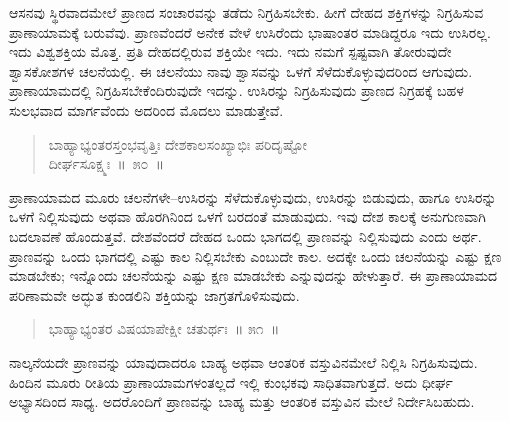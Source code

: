 \vspace{-0.3cm}


ಆಸನವು ಸ್ಥಿರವಾದಮೇಲೆ ಪ್ರಾಣದ ಸಂಚಾರವನ್ನು ತಡೆದು ನಿಗ್ರಹಿಸಬೇಕು. ಹೀಗೆ ದೇಹದ ಶಕ್ತಿಗಳನ್ನು ನಿಗ್ರಹಿಸುವ ಪ್ರಾಣಾಯಾಮಕ್ಕೆ ಬರುವೆವು. ಪ್ರಾಣವೆಂದರೆ ಅನೇಕ ವೇಳೆ ಉಸಿರೆಂದು ಭಾಷಾಂತರ ಮಾಡಿದ್ದರೂ ಇದು ಉಸಿರಲ್ಲ. ಇದು ವಿಶ್ವಶಕ್ತಿಯ ಮೊತ್ತ. ಪ್ರತಿ ದೇಹದಲ್ಲಿರುವ ಶಕ್ತಿಯೇ ಇದು. ಇದು ನಮಗೆ ಸ್ಪಷ್ಟವಾಗಿ ತೋರುವುದೇ ಶ್ವಾಸಕೋಶಗಳ ಚಲನೆಯಲ್ಲಿ. ಈ ಚಲನೆಯು ನಾವು ಶ್ವಾಸವನ್ನು ಒಳಗೆ ಸೆಳೆದುಕೊಳ್ಳುವುದರಿಂದ ಆಗುವುದು. ಪ್ರಾಣಾಯಾಮದಲ್ಲಿ ನಿಗ್ರಹಿಸಬೇಕೆಂದಿರುವುದೇ ಇದನ್ನು. ಉಸಿರನ್ನು ನಿಗ್ರಹಿಸುವುದು ಪ್ರಾಣದ ನಿಗ್ರಹಕ್ಕೆ ಬಹಳ ಸುಲಭವಾದ ಮಾರ್ಗವೆಂದು ಅದರಿಂದ ಮೊದಲು ಮಾಡುತ್ತೇವೆ. 

\vspace{-0.3cm}

\begin{verse}
ಬಾಹ್ಯಾಭ್ಯಂತರಸ್ತಂಭವೃತ್ತಿಃ ದೇಶಕಾಲಸಂಖ್ಯಾಭಿಃ ಪರಿದೃಷ್ಟೋ\\
\hspace{6cm} ದೀರ್ಘಸೂಕ್ಷ್ಮಃ~॥~೫೦~॥
\end{verse}

\vspace{-0.3cm}


ಪ್ರಾಣಾಯಾಮದ ಮೂರು ಚಲನೆಗಳೇ–ಉಸಿರನ್ನು ಸೆಳೆದುಕೊಳ್ಳುವುದು, ಉಸಿರನ್ನು ಬಿಡುವುದು, ಹಾಗೂ ಉಸಿರನ್ನು ಒಳಗೆ ನಿಲ್ಲಿಸುವುದು ಅಥವಾ ಹೊರಗಿನಿಂದ ಒಳಗೆ ಬರದಂತೆ ಮಾಡುವುದು. ಇವು ದೇಶ ಕಾಲಕ್ಕೆ ಅನುಗುಣವಾಗಿ ಬದಲಾವಣೆ ಹೊಂದುತ್ತವೆ. ದೇಶವೆಂದರೆ ದೇಹದ ಒಂದು ಭಾಗದಲ್ಲಿ ಪ್ರಾಣವನ್ನು ನಿಲ್ಲಿಸುವುದು ಎಂದು ಅರ್ಥ. ಪ್ರಾಣವನ್ನು ಒಂದು ಭಾಗದಲ್ಲಿ ಎಷ್ಟು ಕಾಲ ನಿಲ್ಲಿಸಬೇಕು ಎಂಬುದೇ ಕಾಲ. ಅದಕ್ಕೇ ಒಂದು ಚಲನೆಯನ್ನು ಎಷ್ಟು ಕ್ಷಣ ಮಾಡಬೇಕು; ಇನ್ನೊಂದು ಚಲನೆಯನ್ನು ಎಷ್ಟು ಕ್ಷಣ ಮಾಡಬೇಕು ಎನ್ನುವುದನ್ನು ಹೇಳುತ್ತಾರೆ. ಈ ಪ್ರಾಣಾಯಾಮದ ಪರಿಣಾಮವೇ ಅದ್ಭುತ ಕುಂಡಲಿನಿ ಶಕ್ತಿಯನ್ನು ಜಾಗ್ರತಗೊಳಿಸುವುದು. 

\vspace{-0.3cm}

\begin{verse}
ಭಾಹ್ಯಾಭ್ಯಂತರ ವಿಷಯಾಪೇಕ್ಷೀ ಚತುರ್ಥಃ~॥ ೫೧~॥
\end{verse}

\vspace{-0.3cm}


ನಾಲ್ಕನೆಯದೇ ಪ್ರಾಣವನ್ನು ಯಾವುದಾದರೂ ಬಾಹ್ಯ ಅಥವಾ ಆಂತರಿಕ ವಸ್ತುವಿನಮೇಲೆ ನಿಲ್ಲಿಸಿ ನಿಗ್ರಹಿಸುವುದು. ಹಿಂದಿನ ಮೂರು ರೀತಿಯ ಪ್ರಾಣಾಯಾಮಗಳಂತಲ್ಲದೆ ಇಲ್ಲಿ ಕುಂಭಕವು ಸಾಧಿತವಾಗುತ್ತದೆ. ಅದು ಧೀರ್ಘ ಅಭ್ಯಾಸದಿಂದ ಸಾಧ್ಯ. ಅದರೊಂದಿಗೆ ಪ್ರಾಣವನ್ನು ಬಾಹ್ಯ ಮತ್ತು ಆಂತರಿಕ ವಸ್ತುವಿನ ಮೇಲೆ ನಿರ್ದೇಸಿಬಹುದು. 


